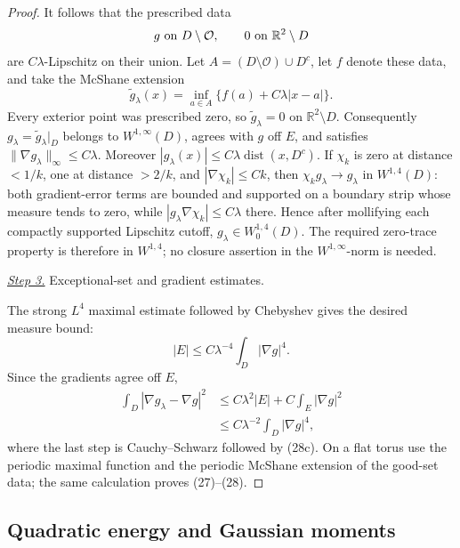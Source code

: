 \documentclass{smfart}
\theoremstyle{definition}
\newcommand{\1}{\mathbf 1}
\begin{document}
\begin{proof}
It follows that the prescribed data
\begin{equation*}
g\ \hbox{on }D\setminus\mathcal O,\qquad
0\ \hbox{on }\mathbb R^2\setminus D
\end{equation*}
are $C\lambda$-Lipschitz on their union.  Let
$A=(D\setminus\mathcal O)\cup D^c$, let $f$ denote these data, and
take the McShane extension
\begin{equation*}
\widetilde g_ \lambda(x)=\inf_ {a\in A}
\{f(a)+C\lambda|x-a|\}.
\end{equation*}
Every exterior point was prescribed zero, so
$\widetilde g_ \lambda=0$ on $\mathbb R^2\setminus D$.
Consequently $g_ \lambda=\widetilde g_ \lambda|_ D$ belongs to
$W^{1,\infty}(D)$, agrees with $g$ off $E$, and satisfies
$\|\nabla g_ \lambda\|_ \infty\leq C\lambda$.  Moreover
$|g_ \lambda(x)|\leq C\lambda\operatorname {dist}(x,D^c)$.
If $\chi_ k$ is zero at distance $<1/k$, one at distance $>2/k$,
and $|\nabla\chi_ k|\leq Ck$, then
$\chi_ kg_ \lambda\to g_ \lambda$ in $W^{1,4}(D)$: both gradient-error
terms are bounded and supported on a boundary strip whose measure tends
to zero, while $|g_ \lambda\nabla\chi_ k|\leq C\lambda$ there.  Hence
after mollifying each compactly supported Lipschitz cutoff,
$g_ \lambda\in W^{1,4}_ 0(D)$.  The required zero-trace property is
therefore in $W^{1,4}$; no closure assertion in the
$W^{1,\infty}$-norm is needed.

\smallskip\noindent
\underline{\textit{Step 3.}} Exceptional-set and gradient estimates.

The strong $L^4$ maximal estimate followed by Chebyshev gives the
desired measure bound:
\begin{equation}
|E|\leq C\lambda^{-4}\int_ D|\nabla g|^4.
\tag{28c}
\end{equation}
Since the gradients agree off $E$,
\begin{equation*}
\begin{split}
\int_ D|\nabla g_ \lambda-\nabla g|^2
&\leq C\lambda^2|E|+C\int_ E|\nabla g|^2\\
&\leq C\lambda^{-2}\int_ D|\nabla g|^4,
\end{split}
\end{equation*}
where the last step is Cauchy--Schwarz followed by (28c).  On a flat
torus use the periodic maximal function and the periodic McShane
extension of the good-set data; the same calculation proves (27)--(28).

\end{proof}

\subsection{Quadratic energy and Gaussian moments}
\end{document}
